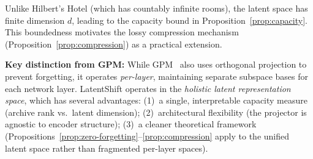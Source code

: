 Unlike Hilbert's Hotel (which has countably infinite rooms), the latent space
has finite dimension $d$, leading to the capacity bound in Proposition~\ref{prop:capacity}.
This boundedness motivates the lossy compression mechanism
(Proposition~\ref{prop:compression}) as a practical extension.

\textbf{Key distinction from GPM:} While GPM~\cite{saha2021gradient} also
uses orthogonal projection to prevent forgetting, it operates \emph{per-layer},
maintaining separate subspace bases for each network layer. LatentShift operates
in the \emph{holistic latent representation space}, which has several advantages:
(1)~a single, interpretable capacity measure (archive rank vs.\ latent dimension);
(2)~architectural flexibility (the projector is agnostic to encoder structure);
(3)~a cleaner theoretical framework (Propositions~\ref{prop:zero-forgetting}--\ref{prop:compression}
    apply to the unified latent space rather than fragmented per-layer spaces).
